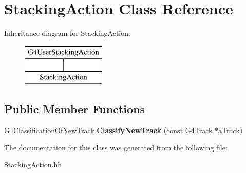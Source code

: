 \hypertarget{classStackingAction}{\section{Stacking\-Action Class Reference}
\label{classStackingAction}
}
Inheritance diagram for Stacking\-Action\-:\begin{figure}[H]
\begin{center}
\leavevmode
\includegraphics[height=2.000000cm]{classStackingAction}
\end{center}
\end{figure}
\subsection*{Public Member Functions}
\begin{DoxyCompactItemize}
\item 
\hypertarget{classStackingAction_a8995da57cfdb2e545e6a5ac3b9510fc8}{G4\-Classification\-Of\-New\-Track {\bfseries Classify\-New\-Track} (const G4\-Track $\ast$a\-Track)}\label{classStackingAction_a8995da57cfdb2e545e6a5ac3b9510fc8}

\end{DoxyCompactItemize}


The documentation for this class was generated from the following file\-:\begin{DoxyCompactItemize}
\item 
Stacking\-Action.\-hh\end{DoxyCompactItemize}
